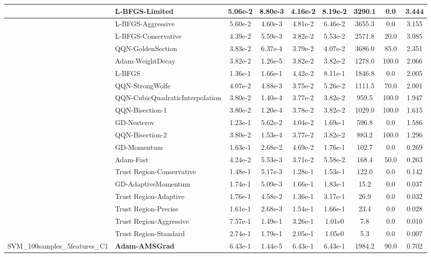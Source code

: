\documentclass{article}
\begin{document}
\begin{longtable}{|l|l|c|c|c|c|c|c|c|}
\hline
 & L-BFGS-Limited & 5.06e-2 & 8.80e-3 & 4.16e-2 & 8.19e-2 & 3290.1 & 0.0 & 3.444 \\
\hline
 & L-BFGS-Aggressive & 5.60e-2 & 4.60e-3 & 4.81e-2 & 6.46e-2 & 3655.3 & 0.0 & 3.155 \\
\hline
 & L-BFGS-Conservative & 4.39e-2 & 5.59e-3 & 3.82e-2 & 5.53e-2 & 2571.8 & 20.0 & 3.085 \\
\hline
 & QQN-GoldenSection & 3.83e-2 & 6.37e-4 & 3.79e-2 & 4.07e-2 & 3686.0 & 85.0 & 2.351 \\
\hline
 & Adam-WeightDecay & 3.82e-2 & 1.26e-5 & 3.82e-2 & 3.82e-2 & 1278.0 & 100.0 & 2.066 \\
\hline
 & L-BFGS & 1.36e-1 & 1.66e-1 & 4.42e-2 & 8.11e-1 & 1846.8 & 0.0 & 2.005 \\
\hline
 & QQN-StrongWolfe & 4.07e-2 & 4.88e-3 & 3.75e-2 & 5.26e-2 & 1111.5 & 70.0 & 2.001 \\
\hline
 & QQN-CubicQuadraticInterpolation & 3.80e-2 & 1.40e-4 & 3.77e-2 & 3.82e-2 & 959.5 & 100.0 & 1.947 \\
\hline
 & QQN-Bisection-1 & 3.80e-2 & 1.20e-4 & 3.78e-2 & 3.82e-2 & 1029.0 & 100.0 & 1.615 \\
\hline
 & GD-Nesterov & 1.23e-1 & 5.62e-2 & 4.04e-2 & 1.69e-1 & 596.8 & 0.0 & 1.586 \\
\hline
 & QQN-Bisection-2 & 3.80e-2 & 1.53e-4 & 3.77e-2 & 3.82e-2 & 883.2 & 100.0 & 1.296 \\
\hline
 & GD-Momentum & 1.63e-1 & 2.68e-2 & 4.69e-2 & 1.76e-1 & 102.7 & 0.0 & 0.269 \\
\hline
 & Adam-Fast & 4.24e-2 & 5.53e-3 & 3.71e-2 & 5.58e-2 & 168.4 & 50.0 & 0.263 \\
\hline
 & Trust Region-Conservative & 1.48e-1 & 5.17e-3 & 1.28e-1 & 1.53e-1 & 122.0 & 0.0 & 0.142 \\
\hline
 & GD-AdaptiveMomentum & 1.74e-1 & 5.09e-3 & 1.66e-1 & 1.83e-1 & 15.2 & 0.0 & 0.037 \\
\hline
 & Trust Region-Adaptive & 1.76e-1 & 4.58e-2 & 1.36e-1 & 3.17e-1 & 26.9 & 0.0 & 0.032 \\
\hline
 & Trust Region-Precise & 1.61e-1 & 2.68e-3 & 1.54e-1 & 1.66e-1 & 23.4 & 0.0 & 0.028 \\
\hline
 & Trust Region-Aggressive & 7.57e-1 & 1.49e-1 & 3.26e-1 & 1.01e0 & 7.8 & 0.0 & 0.010 \\
\hline
 & Trust Region-Standard & 2.74e-1 & 1.79e-1 & 2.05e-1 & 1.05e0 & 5.3 & 0.0 & 0.007 \\
SVM\_100samples\_5features\_C1 & \textbf{Adam-AMSGrad} & 6.43e-1 & 1.44e-5 & 6.43e-1 & 6.43e-1 & 1984.2 & 90.0 & 0.702 \\

\end{longtable}
\end{document}
